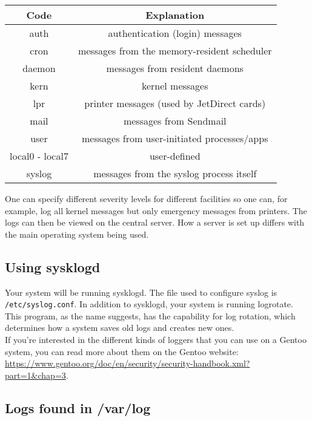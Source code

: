 \documentclass{article}
\begin{document}
\begin{center}
\begin{tabular}{|c|c|}
\hline
Code & Explanation \\
\hline
\hline
auth & authentication (login) messages \\
\hline
cron & messages from the memory-resident scheduler \\
\hline
daemon & messages from resident daemons \\
\hline
kern & kernel messages \\
\hline
lpr & printer messages (used by JetDirect cards) \\
\hline
mail & messages from Sendmail \\
\hline
user & messages from user-initiated processes/apps \\
\hline
local0 - local7 & user-defined \\
\hline
syslog & messages from the syslog process itself \\
\hline
\end{tabular}
\end{center}

One can specify different severity levels for different facilities so one can, for example, log all kernel messages but only emergency messages from printers. The logs can then be viewed on the central server. How a server is set up differs with the main operating system being used.


\subsection*{Using sysklogd}

\indent\indent Your system will be running sysklogd. The file used to configure syslog is \verb|/etc/syslog.conf|. In addition to sysklogd, your system is running logrotate. This program, as the name suggests, has the capability for log rotation, which determines how a system saves old logs and creates new ones. \\

If you're interested in the different kinds of loggers that you can use on a Gentoo system, you can read more about them on the Gentoo website: \url{https://www.gentoo.org/doc/en/security/security-handbook.xml?part=1&chap=3}.


\subsection*{Logs found in /var/log}
\end{document}
